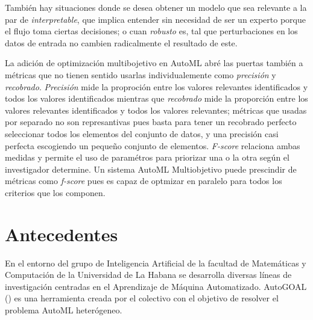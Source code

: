 Tambi\'en hay situaciones donde se desea obtener un modelo que sea relevante a la par de \textit{interpretable}, que implica entender sin necesidad de ser un experto porque el flujo toma ciertas decisiones; o cuan \textit{robusto} es, tal que perturbaciones en los datos de entrada no cambien radicalmente el resultado de este.

La adici\'on de optimizaci\'on multibojetivo en AutoML abr\'e las puertas tambi\'en a m\'etricas que no tienen sentido usarlas individualemente como \textit{precisi\'on} y \textit{recobrado}. 
 \textit{Precisi\'on} mide la proproci\'on entre los valores relevantes identificados y todos los valores identificados
 mientras que \textit{recobrado} mide la proporci\'on entre los valores relevantes identificados y todos los valores relevantes;
m\'etricas que usadas por separado no son represantivas pues basta para tener un recobrado perfecto seleccionar todos los elementos del conjunto de datos, y una precisi\'on casi perfecta escogiendo un pequeño conjunto de elementos.
\textit{F-score} relaciona ambas medidas y permite el uso de  param\'etros para priorizar una o la otra seg\'un el investigador determine. 
Un sistema AutoML Multiobjetivo puede prescindir de m\'etricas como \textit{f-score} pues es capaz de optmizar en paralelo para todos los criterios que los componen.


\section*{Antecedentes}

En el entorno del grupo de Inteligencia Artificial de la facultad de Matem\'aticas y Computaci\'on de la Universidad de La Habana se desarrolla diversas l\'ineas de investigaci\'on centradas en el Aprendizaje de M\'aquina Automatizado. AutoGOAL (\cite{estevez2020solving}) es una herramienta creada por el colectivo con el objetivo de resolver el problema AutoML heter\'ogeneo. 

